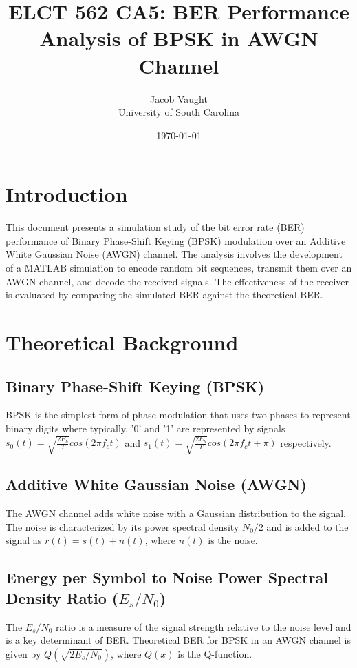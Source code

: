\documentclass{article}
\title{ELCT 562 CA5: BER Performance Analysis of BPSK in AWGN Channel}
\author{Jacob Vaught \\ University of South Carolina}
\date{\today}
\begin{document}
\maketitle

\section{Introduction}
This document presents a simulation study of the bit error rate (BER) performance of Binary Phase-Shift Keying (BPSK) modulation over an Additive White Gaussian Noise (AWGN) channel. The analysis involves the development of a MATLAB simulation to encode random bit sequences, transmit them over an AWGN channel, and decode the received signals. The effectiveness of the receiver is evaluated by comparing the simulated BER against the theoretical BER.

\section{Theoretical Background}
\subsection{Binary Phase-Shift Keying (BPSK)}
BPSK is the simplest form of phase modulation that uses two phases to represent binary digits where typically, '0' and '1' are represented by signals \( s_0(t) = \sqrt{\frac{2E_b}{T}} cos(2\pi f_c t) \) and \( s_1(t) = \sqrt{\frac{2E_b}{T}} cos(2\pi f_c t + \pi) \) respectively.

\subsection{Additive White Gaussian Noise (AWGN)}
The AWGN channel adds white noise with a Gaussian distribution to the signal. The noise is characterized by its power spectral density \( N_0/2 \) and is added to the signal as \( r(t) = s(t) + n(t) \), where \( n(t) \) is the noise.

\subsection{Energy per Symbol to Noise Power Spectral Density Ratio (\(E_s/N_0\))}
The \( E_s/N_0 \) ratio is a measure of the signal strength relative to the noise level and is a key determinant of BER. Theoretical BER for BPSK in an AWGN channel is given by \( Q(\sqrt{2E_s/N_0}) \), where \( Q(x) \) is the Q-function.
\end{document}
